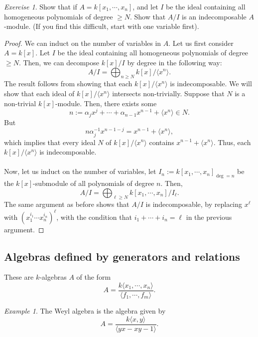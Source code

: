 \documentclass[a4paper]{report}
\theoremstyle{definition}
\theoremstyle{remark}
\theoremstyle{proposition}
\theoremstyle{conjecture}
\theoremstyle{lemma}
\theoremstyle{corollary}
\theoremstyle{exercise}
\newtheorem{exercise}{Exercise}
\theoremstyle{example}
\newtheorem{example}{Example}
\begin{document}
\begin{exercise}
    Show that if $A=k[x_1,\cdots,x_n]$, and let $I$ be the ideal containing
    all homogeneous polynomials of degree $\geq N$. Show that $A/I$ is 
    an indecomposable $A$-module. (If you find this difficult, start with
    one variable first).
\end{exercise}

\begin{proof}
    We can induct on the number of variables in $A$. Let us first consider 
    $A = k[x]$. Let $I$ be the ideal containing all homogeneous polynomials
    of degree $\geq N$. Then, we can decompose $k[x]/I$ by degree in the 
    following way:
    $$A/I = \bigoplus_{n\geq N} k[x]/\langle x^n\rangle.$$
    The result follows from showing that each $k[x]/\langle x^n\rangle$
    is indecomposable. 
    We will show that each ideal of $k[x]/\langle x^n\rangle$ intersects 
    non-trivially. Suppose that $N$ is a non-trivial $k[x]$-module.
    Then, there exists some $$n:= \alpha_j x^j + \cdots + \alpha_{n-1} x^{n-1} +\langle x^n\rangle \in N.$$
    But $$n\alpha_j^{-1}x^{n-1-j} = x^{n-1} + \langle x^n\rangle,$$
    which implies that every ideal $N$ of $k[x]/\langle x^n\rangle$
    contains $x^{n-1} + \langle x^n\rangle$. Thus, each $k[x]/\langle x^n\rangle$
    is indecomposable.\\\\
    Now, let us induct on the number of variables, let $I_n := k[x_1,\cdots,x_n]_{\deg = n}$
    be the $k[x]$-submodule of all polynomials of degree $n$.
    Then, $$A/I = \bigoplus_{\ell\geq N} k[x_1,\cdots,x_n]/I_\ell.$$
    The same argument as before shows that $A/I$ is indecomposable, 
    by replacing $x^\ell$ with $(x_1^{i_1}\cdots x_n^{i_n})^\ell$, 
    with the condition that $i_1 + \cdots + i_n = \ell$ in the previous 
    argument.
\end{proof}

\subsection{Algebras defined by generators and relations}

These are $k$-algebras $A$ of the form
$$A = \frac{k\langle x_1,\cdots,x_n\rangle}{\langle f_1,\cdots,f_m\rangle}.$$

\begin{example}
    The Weyl algebra is the algebra given by 
    $$A = \frac{k\langle x,y\rangle}{\langle yx-xy-1\rangle}.$$
\end{example}
\end{document}
